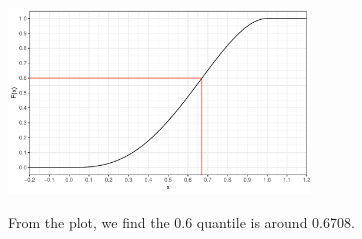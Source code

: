 \documentclass{article}\usepackage[]{graphicx}\usepackage[]{color}
\newenvironment{knitrout}{}{} %
\begin{document}
\begin{enumerate}
\begin{enumerate}
\begin{knitrout}
\color{fgcolor}

{\centering \includegraphics[width=0.6\textwidth]{figure/unnamed-chunk-3-1} 

}



\end{knitrout}
  
  From the plot, we find the 0.6 quantile is around 0.6708.
  	\end{enumerate}
  

\end{enumerate}
% 
%
\end{document}
